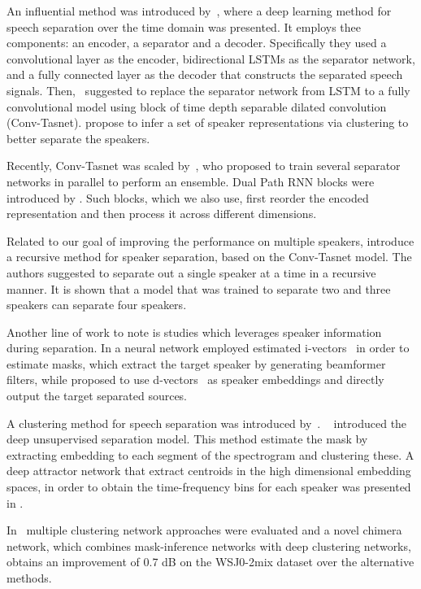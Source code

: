 \documentclass{article}
\begin{document}
An influential method was introduced by~\citet{luo2018tasnet}, where a deep learning method for speech separation over the time domain was presented. It employs thee components: an encoder, a separator and a decoder. Specifically they used a convolutional layer as the encoder, bidirectional LSTMs as the separator network, and a fully connected layer as the decoder that constructs the separated speech signals. Then,~\citet{luo2019conv} suggested to replace the separator network from LSTM to a fully convolutional model using block of time depth separable dilated convolution (Conv-Tasnet). \citet{zeghidour2020wavesplit} propose to infer a set of speaker representations via clustering to better separate the speakers.

Recently, Conv-Tasnet was scaled by~\citet{zhang2020furcanext}, who proposed to train several separator networks in parallel to perform an ensemble. Dual Path RNN blocks were introduced by \citet{luo2019dual}. Such blocks, which we also use, first reorder the encoded representation and then process it across different dimensions. 

Related to our goal of improving the performance on multiple speakers, \citet{takahashi2019recursive} introduce a recursive method for speaker separation, based on the Conv-Tasnet model. The authors suggested to separate out a single speaker at a time in a recursive manner. It is shown that a model that was trained to separate two and three speakers can separate four speakers. 

Another line of work to note is studies which leverages speaker information during separation. In \cite{zmolikova2017speaker,delcroix2018single} a neural network employed estimated i-vectors~\cite{ivectors} in order to estimate masks, which extract the target speaker by generating beamformer filters, while \citet{wang2018voicefilter} proposed to use d-vectors~\cite{dvectors} as speaker embeddings and directly output the target separated sources. 

A clustering method for speech separation was introduced by~\citet{isik2016single, 8045733}. ~\citet{isik2016single} introduced the deep unsupervised separation model. This method estimate the mask by extracting embedding to each segment of the spectrogram and clustering these. A deep attractor network that extract centroids in the high dimensional embedding spaces, in order to obtain the time-frequency bins for each speaker was presented in \cite{chen2017deep}.

 In~\cite{wang2018alternative} multiple clustering network approaches were evaluated and a novel chimera network, which combines mask-inference networks with deep clustering networks, obtains an improvement of 0.7 dB on the WSJ0-2mix dataset over the alternative methods.
\end{document}
